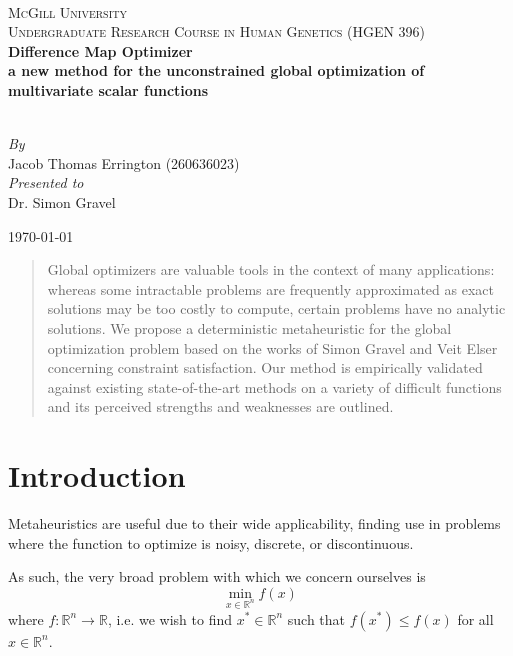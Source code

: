 \documentclass[12pt]{article}
\begin{document}
\begin{titlepage}
    \begin{center}
        ~\\[2.0cm]

        \textsc{\LARGE McGill University}\\[1.5cm]

        \textsc{\Large Undergraduate Research Course in Human Genetics (HGEN 396)}\\[1.0cm]

        {\huge \bfseries Difference Map Optimizer \\ a new method for the unconstrained global optimization of multivariate scalar functions}

        ~\\[2.0cm]

        \emph{By}\\
        Jacob Thomas Errington (260636023)\\[1.0cm]

        \emph{Presented to}\\
        Dr. Simon Gravel

        \vfill

        \today
    \end{center}
\end{titlepage}

\begin{abstract}
    Global optimizers are valuable tools in the context of many applications:
    whereas some intractable problems are frequently approximated as exact
    solutions may be too costly to compute, certain problems have no analytic
    solutions.
    We propose a deterministic metaheuristic for the global optimization
    problem based on the works of Simon Gravel and Veit Elser concerning
    constraint satisfaction.
    Our method is empirically validated against existing state-of-the-art
    methods on a variety of difficult functions and its perceived strengths and
    weaknesses are outlined.
\end{abstract}

\section{Introduction}
    Metaheuristics are useful due to their wide applicability, finding use in
    problems where the function to optimize is noisy, discrete, or
    discontinuous.

    As such, the very broad problem with which we concern ourselves is
    $$
    \min_{x \in \mathbb{R}^n} f(x)
    $$
    where $f : \mathbb{R}^n \to \mathbb{R}$,
    i.e. we wish to find $x^* \in \mathbb{R}^n$
    such that $f(x^*) \leq f(x)$ for all $x \in \mathbb{R}^n$.
\end{document}
